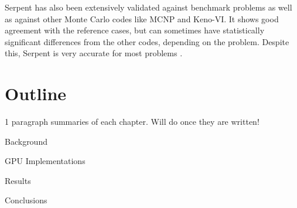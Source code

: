 Serpent has also been extensively validated against benchmark problems as well as against other Monte Carlo codes like MCNP and Keno-VI.  It shows good agreement  with the reference cases, but can sometimes have statistically significant differences from the other codes, depending on the problem.  Despite this, Serpent is very accurate for most problems \cite{serpent}.

\section{Outline}

1 paragraph summaries of each chapter.  Will do once they are written!

Background 

GPU Implementations

Results

Conclusions
